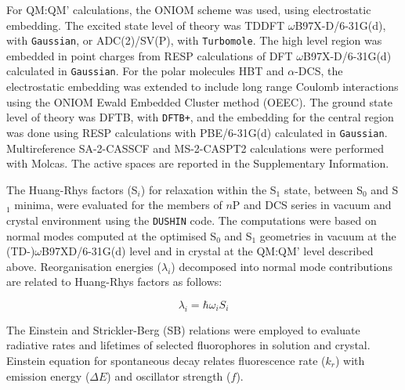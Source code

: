 For QM:QM' calculations, the ONIOM scheme was used, using electrostatic embedding. The excited state level of theory was TDDFT $\omega$B97X-D/6-31G(d), with \texttt{Gaussian}, or ADC(2)/SV(P), with \texttt{Turbomole}\cite{TURBOMOLE}. The high level region was embedded in point charges from RESP calculations of DFT $\omega$B97X-D/6-31G(d) calculated in \texttt{Gaussian}. For the polar molecules HBT and $\alpha$-DCS, the electrostatic embedding was extended to include long range Coulomb interactions using the ONIOM Ewald Embedded Cluster method (OEEC).\cite{Rivera2019} The ground state level of theory was DFTB, with \texttt{DFTB+}\cite{Aradi2007}, and the embedding for the central region was done using RESP calculations with PBE/6-31G(d) calculated in \texttt{Gaussian}. Multireference SA-2-CASSCF and MS-2-CASPT2 calculations were performed with Molcas.\cite{Aquilante2016} The active spaces are reported in the Supplementary Information.


The Huang-Rhys factors (S$_i$) for relaxation within the S$_1$ state, between S$_0$ and S$_1$ minima, were evaluated for the members of $n$P and DCS series in vacuum and crystal environment using the \texttt{DUSHIN} code.\cite{Reimers2001AMolecules} The computations were based on normal modes computed at the optimised S$_0$ and S$_1$ geometries in vacuum at the (TD-)$\omega$B97XD/6-31G(d) level and in crystal at the QM:QM' level described above. Reorganisation energies ($\lambda_i$) decomposed into normal mode contributions are related to Huang-Rhys factors as follows: 

\begin{equation}
\lambda_i = \hbar \omega_i S_i
\label{eq_hr}
\end{equation}

The Einstein\cite{Crespo-Otero2012} and Strickler-Berg\cite{SBrelation} (SB) relations were employed to evaluate radiative rates and lifetimes of selected fluorophores in solution and crystal. Einstein equation for spontaneous decay relates fluorescence rate ($k_r$) with emission energy ($\Delta E$) and oscillator strength ($f$).

